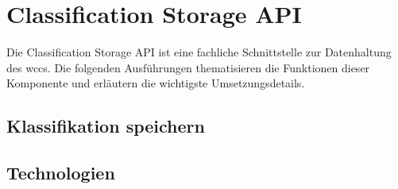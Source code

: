 \section{Classification Storage API}
    \label{section:solutionDetailsStorageAPI}
    Die Classification Storage API ist eine fachliche Schnittstelle zur Datenhaltung des \gls{wccs}.
    Die folgenden Ausführungen thematisieren die Funktionen dieser Komponente und erläutern die wichtigste Umsetzungsdetails.

    

    \subsection{Klassifikation speichern}
        \label{section:solutionDetailsStorageAPIStoreClassification}
        

    \subsection{Technologien}